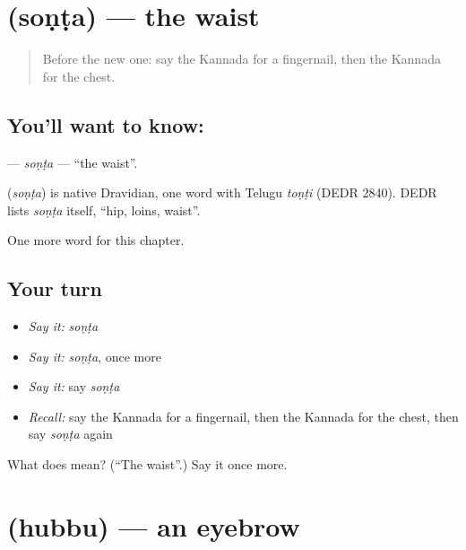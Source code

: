 \section[\texorpdfstring{\kn{ಸೊಂಟ} (soṇṭa)}{ಸೊಂಟ (soṇṭa)}]{ (soṇṭa) — the waist}

\label{lesson:KA-C136-sonta}



\begin{quote}
Before the new one: say the Kannada for a fingernail, then the Kannada for the chest.
\end{quote}

\subsection*{You'll want to know: }
\textbf{} — \emph{soṇṭa} — \textquotedblleft{}the waist\textquotedblright{}.

\begin{cousinweb}
\textbf{} (\emph{soṇṭa}) is native Dravidian, one word with Telugu \emph{toṇṭi} (DEDR 2840). DEDR lists \emph{soṇṭa} itself, \textquotedblleft{}hip, loins, waist\textquotedblright{}.
\end{cousinweb}

\begin{grammarlens}[title={What you've built}]
One more word for this chapter.
\end{grammarlens}

\subsection*{Your turn}
\begin{itemize}
\raggedright
  \item \emph{Say it:} \emph{soṇṭa}
  \item \emph{Say it:} \emph{soṇṭa}, once more
  \item \emph{Say it:} say \emph{soṇṭa}
  \item \emph{Recall:} say the Kannada for a fingernail, then the Kannada for the chest, then say \emph{soṇṭa} again
\end{itemize}

\begin{tcolorbox}[breakable,colback=teal!4,colframe=teal!35!black,title={Before you move on}]
What does  mean? (\textquotedblleft{}The waist\textquotedblright{}.) Say it once more.
\end{tcolorbox}
\section[\texorpdfstring{\kn{ಹುಬ್ಬು} (hubbu)}{ಹುಬ್ಬು (hubbu)}]{ (hubbu) — an eyebrow}

